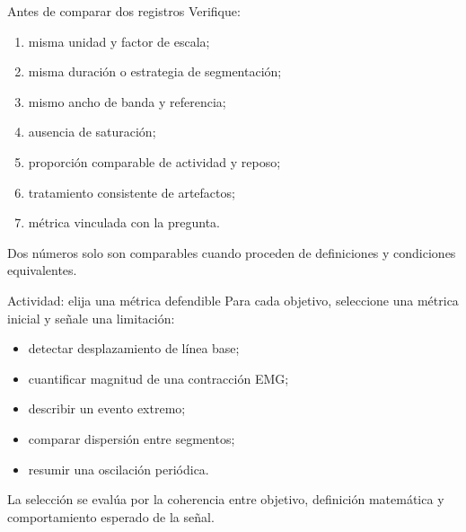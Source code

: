 \documentclass[
  ignorenonframetext,
  aspectratio=169,
  spanish,
  professionalfonts]{beamer}
\providecommand{\tightlist}{%
  \setlength{\itemsep}{0pt}\setlength{\parskip}{0pt}}
\begin{document}
\begin{frame}{Antes de comparar dos registros}
\protect{}\label{antes-de-comparar-dos-registros}
Verifique:

\begin{enumerate}
\tightlist
\item
  misma unidad y factor de escala;
\item
  misma duración o estrategia de segmentación;
\item
  mismo ancho de banda y referencia;
\item
  ausencia de saturación;
\item
  proporción comparable de actividad y reposo;
\item
  tratamiento consistente de artefactos;
\item
  métrica vinculada con la pregunta.
\end{enumerate}

\begin{tcolorbox}[enhanced jigsaw, arc=.35mm, bottomrule=.15mm, bottomtitle=1mm, breakable, colback=white, colbacktitle=quarto-callout-important-color!10!white, colframe=quarto-callout-important-color-frame, coltitle=black, left=2mm, leftrule=.75mm, opacityback=0, opacitybacktitle=0.6, rightrule=.15mm, title={Principio de comparabilidad}, titlerule=0mm, toprule=.15mm, toptitle=1mm]

Dos números solo son comparables cuando proceden de definiciones y
condiciones equivalentes.

\end{tcolorbox}
\end{frame}

\begin{frame}{Actividad: elija una métrica defendible}
\protect{}\label{actividad-elija-una-muxe9trica-defendible}
Para cada objetivo, seleccione una métrica inicial y señale una
limitación:

\begin{itemize}
\tightlist
\item
  detectar desplazamiento de línea base;
\item
  cuantificar magnitud de una contracción EMG;
\item
  describir un evento extremo;
\item
  comparar dispersión entre segmentos;
\item
  resumir una oscilación periódica.
\end{itemize}

\begin{tcolorbox}[enhanced jigsaw, arc=.35mm, bottomrule=.15mm, bottomtitle=1mm, breakable, colback=white, colbacktitle=quarto-callout-tip-color!10!white, colframe=quarto-callout-tip-color-frame, coltitle=black, left=2mm, leftrule=.75mm, opacityback=0, opacitybacktitle=0.6, rightrule=.15mm, title={No existe una respuesta universal}, titlerule=0mm, toprule=.15mm, toptitle=1mm]

La selección se evalúa por la coherencia entre objetivo, definición
matemática y comportamiento esperado de la señal.

\end{tcolorbox}
\end{frame}
\end{document}

